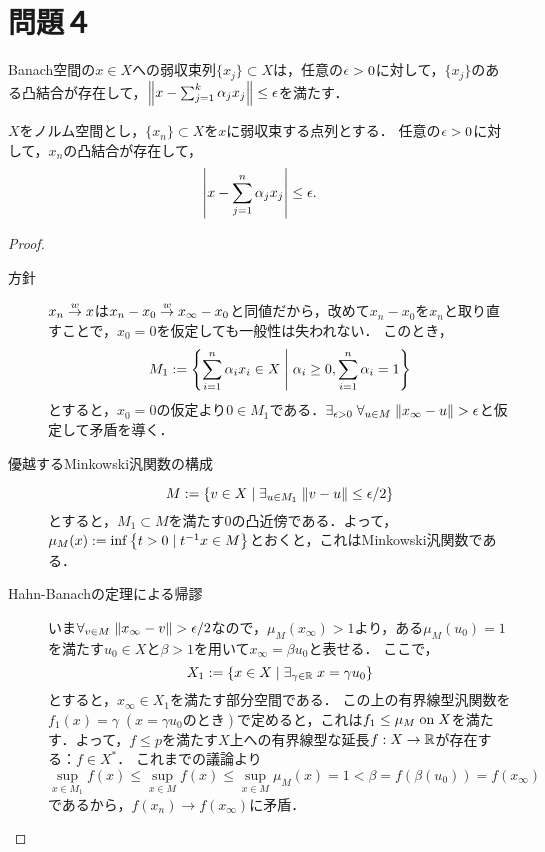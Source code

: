 \documentclass[uplatex,dvipdfmx]{jsarticle}
\begin{document}
\section{問題４}

\begin{tcolorbox}[colframe=ForestGreen, colback=ForestGreen!10!white,breakable,colbacktitle=ForestGreen!40!white,coltitle=black,fonttitle=\bfseries\sffamily,
title=]
    Banach空間の$x\in X$への弱収束列$\{x_j\}\subset X$は，任意の$\epsilon>0$に対して，$\{x_j\}$のある凸結合が存在して，$\left\|x-\sum^k_{j=1}\alpha_jx_j\right\|\le\epsilon$を満たす．
\end{tcolorbox}

\begin{theorem}[Mazur, S.]
    $X$をノルム空間とし，$\{x_n\}\subset X$を$x$に弱収束する点列とする．
    任意の$\epsilon>0$に対して，$x_n$の凸結合が存在して，
    \[\left|x-\sum_{j=1}^n\alpha_jx_j\right|\le\epsilon.\]
\end{theorem}
\begin{proof}\mbox{}
    \begin{description}
        \item[方針] $x_n\overset{w}{\to} x$は$x_n-x_0\overset{w}{\to} x_\infty-x_0$と同値だから，改めて$x_n-x_0$を$x_n$と取り直すことで，$x_0=0$を仮定しても一般性は失われない．
        このとき，
        \[M_1:=\left\{\sum^n_{i=1}\alpha_ix_i\in X\;\middle|\;\alpha_i\ge0,\sum^n_{i=1}\alpha_i=1\right\}\]
        とすると，$x_0=0$の仮定より$0\in M_1$である．$\exists_{\ep>0}\;\forall_{u\in M}\;\norm{x_\infty-u}>\ep$と仮定して矛盾を導く．
        \item[優越するMinkowski汎関数の構成] 
        \[M:=\left\{v\in X\mid\exists_{u\in M_1}\;\|v-u\|\le\epsilon/2\right\}\]
        とすると，$M_1\subset M$を満たす$0$の凸近傍である．よって，$\mu_M(x):=\inf\left\{t>0\mid t^{-1}x\in M\right\}$とおくと，これはMinkowski汎関数である．
        \item[Hahn-Banachの定理による帰謬]
        いま$\forall_{v\in M}\;\norm{x_\infty-v}>\ep/2$なので，$\mu_M(x_\infty)>1$より，ある$\mu_M(u_0)=1$を満たす$u_0\in X$と$\beta>1$を用いて$x_\infty=\beta u_0$と表せる．
        ここで，
        \[X_1:=\left\{x\in X\mid\exists_{\gamma\in\mathbb{R}}\;x=\gamma u_0\right\}\]
        とすると，$x_\infty\in X_1$を満たす部分空間である．
        この上の有界線型汎関数を$f_1(x)=\gamma\;(x=\gamma u_0\text{のとき})$で定めると，これは$f_1\le\mu_M\;\mathrm{on}\; X$を満たす．よって，$f\le p$を満たす$X$上への有界線型な延長$f:X\to\mathbb{R}$が存在する：$f\in X^*$．
        これまでの議論より
        \[\sup_{x\in M_1}f(x)\le\sup_{x\in M}f(x)\le\sup_{x\in M}\mu_M(x)=1<\beta=f(\beta(u_0))=f(x_\infty)\]
        であるから，$f(x_n)\to f(x_\infty)$に矛盾．
    \end{description}
\end{proof}
\end{document}
